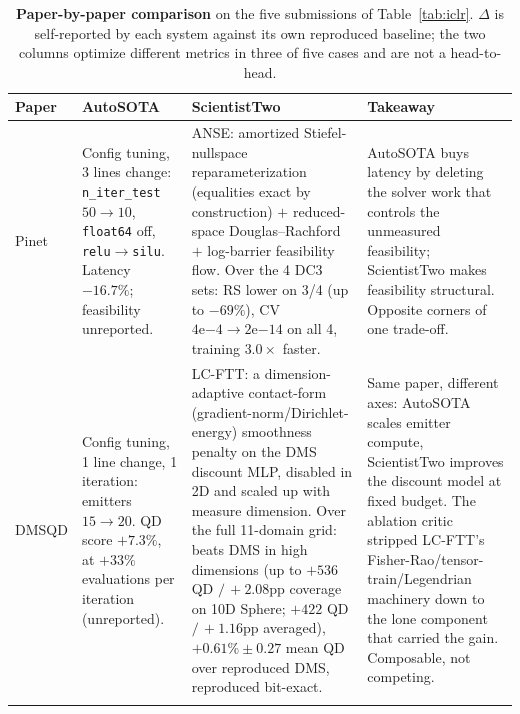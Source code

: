 \newpage
\begin{table}[h!]
\centering
\footnotesize
\setlength{\tabcolsep}{3pt}
\renewcommand{\arraystretch}{1.1}
\caption{\textbf{Paper-by-paper comparison} on the five submissions of Table~\ref{tab:iclr}.
$\Delta$ is self-reported by each system against its own reproduced baseline; the two columns
optimize different metrics in three of five cases and are not a head-to-head.}
\label{tab:autosota-qual}
\begin{tabular}{@{}p{}p{}p{}p{}@{}}
\toprule
\textbf{Paper} & \textbf{AutoSOTA} & \textbf{ScientistTwo} & \textbf{Takeaway} \\
\midrule

Pinet \newline \citep{grontas2026pinet}
& Config tuning, 3 lines change: \texttt{n\_iter\_test} $50\!\to\!10$, \texttt{float64} off,
  \texttt{relu}$\to$\texttt{silu}. Latency $-16.7\%$; feasibility unreported.
& \textsc{ANSE}: amortized Stiefel-nullspace reparameterization (equalities exact by
  construction) $+$ reduced-space Douglas--Rachford $+$ log-barrier feasibility flow. Over the 4
  DC3 sets: RS lower on 3/4 (up to $-69\%$), CV $4\mathrm{e}{-4}\!\to\!2\mathrm{e}{-14}$ on all 4,
  training $3.0\times$ faster.
& AutoSOTA buys latency by deleting the solver work that controls the unmeasured feasibility;
  ScientistTwo makes feasibility structural. Opposite corners of one trade-off. \\
\addlinespace

DMSQD \newline \citep{tjanaka2026discount}
& Config tuning, 1 line change, 1 iteration: emitters $15\!\to\!20$. QD score $+7.3\%$, at $+33\%$
  evaluations per iteration (unreported).
& \textsc{LC-FTT}: a dimension-adaptive contact-form (gradient-norm/Dirichlet-energy) smoothness
  penalty on the DMS discount MLP, disabled in 2D and scaled up with measure dimension. Over the
  full 11-domain grid: beats DMS in high dimensions (up to $+536$ QD $/\,{+}2.08$pp coverage on 10D
  Sphere; $+422$ QD $/\,{+}1.16$pp averaged), $+0.61\%{\pm}0.27$ mean QD over reproduced DMS,
  reproduced bit-exact.
& Same paper, different axes: AutoSOTA scales emitter compute, ScientistTwo improves the discount
  model at fixed budget. The ablation critic stripped LC-FTT's Fisher-Rao/tensor-train/Legendrian
  machinery down to the lone component that carried the gain. Composable, not competing. \\
\addlinespace


\end{tabular}
\end{table}
